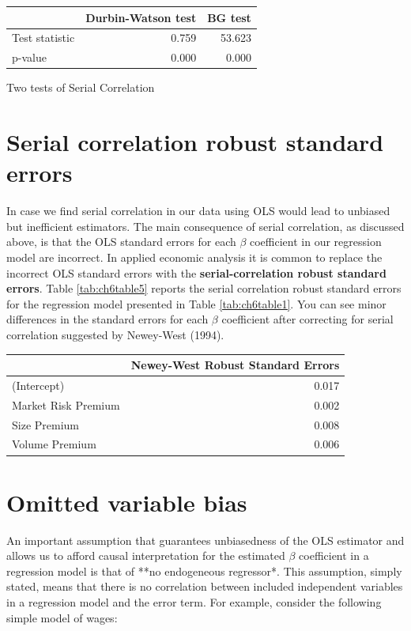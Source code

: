 \documentclass[
]{book}
\theoremstyle{definition}
\theoremstyle{definition}
\theoremstyle{definition}
\theoremstyle{definition}
\theoremstyle{remark}
\begin{document}
\begin{tabular}{l|r|r}
\hline
  & Durbin-Watson test & BG test\\
\hline
Test statistic & 0.759 & 53.623\\
\hline
p-value & 0.000 & 0.000\\
\hline
\end{tabular}

\label{tab:ch6table4} Two tests of Serial Correlation

\hypertarget{serial-correlation-robust-standard-errors}{%
\section{Serial correlation robust standard errors}\label{serial-correlation-robust-standard-errors}}

In case we find serial correlation in our data using OLS would lead to unbiased but inefficient estimators. The main consequence of serial correlation, as discussed above, is that the OLS standard errors for each \(\beta\) coefficient in our regression model are incorrect. In applied economic analysis it is common to replace the incorrect OLS standard errors with the \textbf{serial-correlation robust standard errors}. Table \ref{tab:ch6table5} reports the serial correlation robust standard errors for the regression model presented in Table \ref{tab:ch6table1}. You can see minor differences in the standard errors for each \(\beta\) coefficient after correcting for serial correlation suggested by Newey-West (1994).

\begin{tabular}{l|r}
\hline
  & Newey-West Robust Standard Errors\\
\hline
(Intercept) & 0.017\\
\hline
Market Risk Premium & 0.002\\
\hline
Size Premium & 0.008\\
\hline
Volume Premium & 0.006\\
\hline
\end{tabular}

\hypertarget{omitted-variable-bias}{%
\section{Omitted variable bias}\label{omitted-variable-bias}}

An important assumption that guarantees unbiasedness of the OLS estimator and allows us to afford causal interpretation for the estimated \(\beta\) coefficient in a regression model is that of **no endogeneous regressor*. This assumption, simply stated, means that there is no correlation between included independent variables in a regression model and the error term. For example, consider the following simple model of wages:
\end{document}
